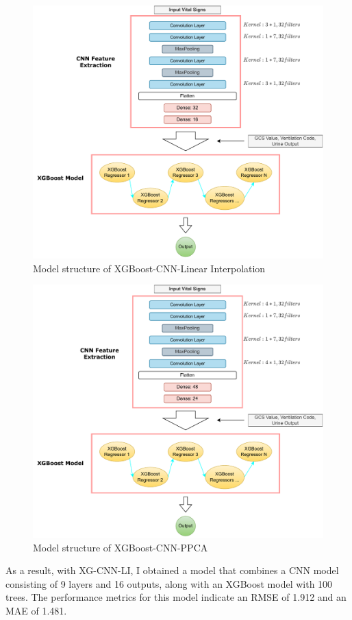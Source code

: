 \documentclass[12pt,a4paper,english
]{tunithesis}
\begin{document}
\begin{figure}
  \begin{center}
    \includegraphics[width=1\textwidth]{thesis/img/xg_cnn_li.pdf}
  \end{center}
  \caption[XGBoost-CNN-LI model]{Model structure of XGBoost-CNN-Linear Interpolation}
  \label{fig:xg_cnn_li_struc}
\end{figure}

\begin{figure}
  \begin{center}
    \includegraphics[width=1\textwidth]{thesis/img/xg_cnn_ppca.pdf}
  \end{center}
  \caption[XGBoost-CNN-PPCA model]{Model structure of XGBoost-CNN-PPCA}
  \label{fig:xg_cnn_ppca_struc}
\end{figure}
As a result, with XG-CNN-LI, I obtained a model that combines a CNN model consisting of 9 layers and 16 outputs, along with an XGBoost model with 100 trees. The performance metrics for this model indicate an RMSE of 1.912 and an MAE of 1.481.
\end{document}
